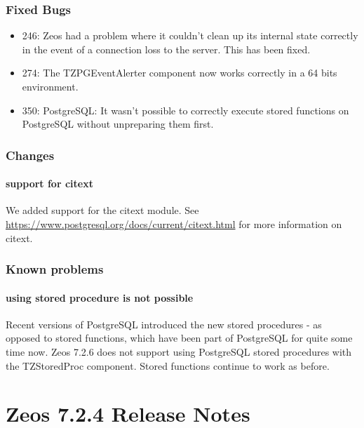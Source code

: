 \documentclass[a4paper,12pt,oneside]{book}
\begin{document}
\subsection{Fixed Bugs}
\label{sec:Rev6_postgresql_FixedBugs}

\begin{itemize}
\item	
  246: Zeos had a problem where it couldn't clean up its internal state correctly in the event of a connection loss to the server.
	This has been fixed.
\item	
  274: The TZPGEventAlerter component now works correctly in a 64 bits environment.
\item
  350: PostgreSQL: It wasn't possible to correctly execute stored functions on PostgreSQL without unpreparing them first.
\end{itemize}

\subsection{Changes}
\label{sec:Rev6_postgresql_Changes}

\subsubsection{support for citext}
\label{sec:Rev6_postgresql_Changes_citext}

We added support for the citext module.
See \url{https://www.postgresql.org/docs/current/citext.html} for more information on citext.

\subsection{Known problems}
\label{sec:Rev6_postgresql_KnownProblems}

\subsubsection{using stored procedure is not possible}
\label{sec:Rev6_postgresql_KnownProblems_storedprocedures}
Recent versions of PostgreSQL introduced the new stored procedures - as opposed to stored functions, which have been part of PostgreSQL for quite some time now.
Zeos 7.2.6 does not support using PostgreSQL stored procedures with the TZStoredProc component.
Stored functions continue to work as before.

\chapter{Zeos 7.2.4 Release Notes}
\end{document}
